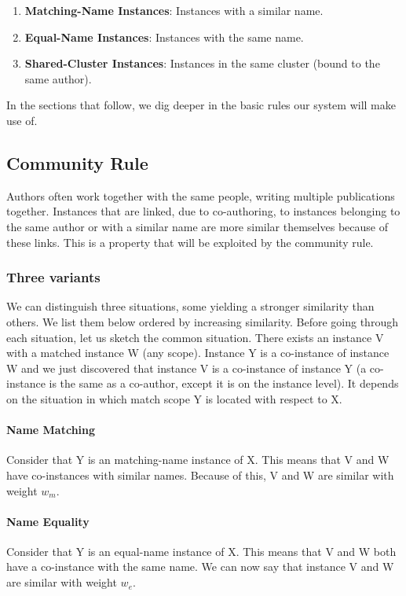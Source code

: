 \begin{enumerate}
\item \textbf{Matching-Name Instances}: Instances with a similar name.
\item \textbf{Equal-Name Instances}: Instances with the same name.
\item \textbf{Shared-Cluster Instances}: Instances in the same cluster (bound to the same author).
\end{enumerate}

In the sections that follow, we dig deeper in the basic rules our system will make use of.

\subsection{Community Rule}

Authors often work together with the same people, writing multiple publications together. Instances that are linked, due to co-authoring, to instances belonging to the same author or with a similar name are more similar themselves because of these links. This is a property that will be exploited by the community rule. 

\subsubsection{Three variants}

We can distinguish three situations, some yielding a stronger similarity than others. We list them below ordered by increasing similarity. Before going through each situation, let us sketch the common situation. There exists an instance V with a matched instance W (any scope). Instance Y is a co-instance of instance W and we just discovered that instance V is a co-instance of instance Y (a co-instance is the same as a co-author, except it is on the instance level). It depends on the situation in which match scope Y is located with respect to X.

\paragraph{Name Matching} Consider that Y is an matching-name instance of X. This means that V and W have co-instances with similar names. Because of this, V and W are similar with weight $w_m$.

\paragraph{Name Equality} Consider that Y is an equal-name instance of X. This means that V and W both have a co-instance with the same name. We can now say that instance V and W are similar with weight $w_e$.

